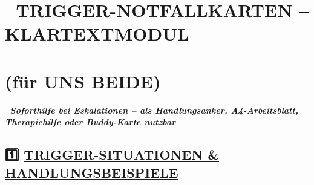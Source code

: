 %


\hypertarget{trigger-notfallkarten-klartextmodul}{%
\section{\texorpdfstring{\textbf{🚨 TRIGGER-NOTFALLKARTEN -- KLARTEXTMODUL} }{🚨 TRIGGER-NOTFALLKARTEN -- KLARTEXTMODUL }}\label{trigger-notfallkarten-klartextmodul}}

\hypertarget{fuxfcr-uns-beide}{%
\section{\texorpdfstring{\textbf{(für UNS BEIDE)}}{(für UNS BEIDE)}}\label{fuxfcr-uns-beide}}

🧩 \emph{\textbf{Soforthilfe bei Eskalationen -- als Handlungsanker, A4-Arbeitsblatt, Therapiehilfe oder Buddy-Karte nutzbar}}

\hypertarget{trigger-situationen-handlungsbeispiele}{%
\subsection{\texorpdfstring{\textbf{1️⃣ \ul{TRIGGER-SITUATIONEN \& HANDLUNGSBEISPIELE}}}{1️⃣ TRIGGER-SITUATIONEN \& HANDLUNGSBEISPIELE}}\label{trigger-situationen-handlungsbeispiele}}

